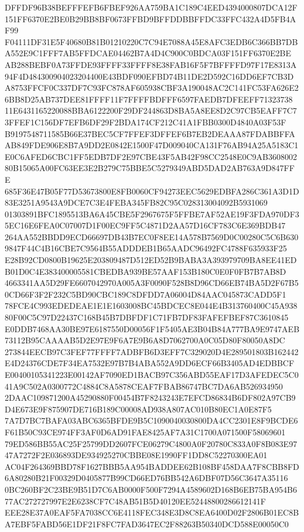 \documentclass[UTF8,fontset=fandol,zihao=-4,a4paper]{ctexart}
\begin{document}
{{DFFDF96B38BEFFFEFB6FBEF926AA759BA1C189C4EED4394000807DCA12F151FF6370E2BE0B29BB8BF0673FFBD9BFFDDBBFFDC33FFC432A4D5FB4AF99
F04111DF31E5F40680B81B01210220C7C94E7088A45E8AFC3EDB6C366BB7DBA552E9C1FFF7AB5FFDCAE04462B7A4D4C900C0BDCA03F151FF6370E2BE
AB288BEBF0A73FFDE93FFFF33FFFF8E38FAB16F5F7BFFFFD97F17E8313A94F4D484300904023204400E43BDF090EFBD74B11DE2D592C16DD6EF7CB3D
A8753FFCF0C337DF7C93FC878AF605938CBF3A190048AC2C141FC53FA626E26BB8D25AB737DEE81FFFF11F7FFFFBDFFF6597FAEDB7DFEEFF71323738
11E6431165220088BBA6122200F29DF244863D8BA5A8EE8D2C97CB5EAFF7C73FFEF1C156DF7EFB6DF29F2BDA174CF212C41A1FBB0300D4840A03F53F
B9197548711585B66E37BEC5CF7FFEF3DFFEF6B7EB2DEAAA87FDABBFFAAB849FDE906E8B7A9DD2E0842E1500F47D009040CA131F76AB94A25A5183C1
E0C6AFED6CBC1FF5EDB7DF2E97CBE43F5AB42F98CC2548E0C9AB360800280B15065A00FC63EE3E2B279C75BBE5C5279349ABD5DAD2AB763A9D847FFE
685F36E47B05F77D53673800E8FB0060CF94273EEC5629EDBFA286C361A3D1D83E3251A9543A9DCE7C3E4FEBA345FB82C95C028313004092B5931069
01303891BFC1895513BA6A45CBE5F2967675F5FFBE7AF52AE19F3FDA970DF35EC16E6FEA0C07007D1F00EC9FF5C4871D2AA57D16CF783C6E369BDB47
264AA552BBDD9ECD66697DB43B7EC0F8EE14A578B7569D0C00280C5C6B6309847F44C4B16CBE7C9564B55ADDDEB1B65AADC96492FC4788F635933F25
E28B92CD0800B19625E203809487D512ED52B9BABA3A393979709BA8EE41EDB01D0C4E383400005581CBEDBA939BE57AAF153B180C0E0F0FB7B7AB8D
4663341AA5D29FE6607042970A005A3F0090F528B8D96CD66EB74BA5D2F67B50CD66F3F2F232C5BD90CBC189C8DFDD7A06004D84AAC045873CADD5F1
78FCE4C993EDEDEAE1E1E1603008BC45BDCEC8E044E4B313760400C45A93880F00C5C97D22437C168B45B7DBFDF1C71FB7DF83FAFEFBEF87C3610845
E0DDB7468AA30BE97E6187550D00056F1F5405AE3B04B84A777BA9E9747AEB73112B95CAAAAB5D2E97E9F6A7E9B6A8D7062700A0C05D80F80050A8DC
273844EECB97C3FEF77FFFF7ADBFB6D3EFF7C329020D4E289501803B162442E4D24376CDE7F34EA7532E97B7B4ABA552A9DD6ECF66B3405AD4EDBBCF
E00400105341223E00142AF7090ED1BACB97C356ABD55EAF17D3AFEDEC5C041A9C502A0300772C4884C8A5878CEAF7FBAB86747BC7DA6AB526934950
2DAAC109871200A45290880F00454B7F8243243E7EFCD86834B6DF802A97CB9D4E673E9F875907DE716B189C00008AD938A807AC010B80EC1A0E87F5
7A7D7BC7BAFA03ABC6365BFDE9B5C1090040030800DA4CC2301E8F9BCDE6F61B50C93CE974FF3AF0D6AD91FAE8425AF7A31C1700A071500F58069601
79ED586BB55AC25F25799DD2607FCE06279C4800A0F20780C833A0F8B083E9747A7272F2E036893DE934925270CBBE08E1990FF1DD8C52270300EA01
AC04F264369BBD78F1627BBB5AA954BADDEE62B108BF458DAA7F8CBB8FD6A80280B21F00329D0405877B99CD66ED76BB542A6DBF07D56C3647A35116
0BC260BF2C23BE9B51D7C6AB0000F500F7294A4589602D168B6EB75BA954B677AC272727997E2E6238CF7C48AB51B5D40120EE52448800286612141F
EEE28E37A0EAF5FA7038CC6E4118FEC348E3D8C8EA6400D02F2806B01EC8BA7EBF5FABD56E1DF21F8FC7FAD3647EC2F88263B50340DCD588E00050C0
}}
\end{document}

